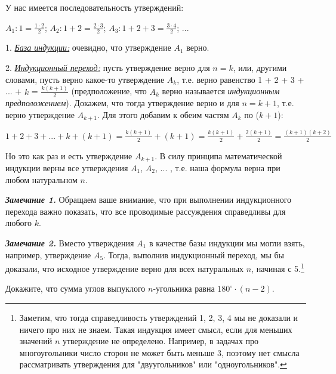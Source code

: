 \begin{prf}
У нас имеется последовательность утверждений:
\par
$A_1 : 1 = \frac{1 \cdot 2}{2}$;
\hfill
$A_2 : 1 + 2 = \frac{2 \cdot 3}{2}$;
\hfill
$A_3 : 1 + 2 + 3  = \frac{3 \cdot 4}{2}$;
\hfill
...
\par
1. \textit{\underline{База индукции:}} очевидно, что утверждение $A_1$ верно.
\par
2. \textit{\underline{Индукционный переход:}} пусть утверждение верно для $n = k$, или, другими словами, пусть верно какое-то
утверждение $A_k$, т.е. верно равенство 1 + 2 + 3 + ... + $k$ = $\frac{k(k+1)}{2}$ (предположение, что $A_k$ верно называется
\textit{индукционным предположением}). Докажем, что тогда утверждение верно и для $n = k +1$, т.е. верно утверждение $A_{k+1}$. Для этого добавим к обеим частям $A_k$ по ($k + 1$):

$1 + 2 + 3 + ... + k + (k + 1) = \frac{k(k+1)}{2} + (k + 1) = \frac{k(k+1)}{2} + \frac{2(k+1)}{2} = \frac{(k+1)(k+2)}{2}$

Но это как раз и есть утверждение $A_{k+1}$. В силу принципа математической индукции верны все утверждения
$A_1$, $A_2$, ... , т.е. наша формула верна при любом натуральном $n$.
\end{prf}

\par

\textbf{\textit{Замечание 1.}} Обращаем ваше внимание, что при выполнении индукционного перехода важно показать, что
все проводимые рассуждения справедливы для любого $k$.

\textbf{\textit{Замечание 2.}} Вместо утверждения $A_1$ в качестве базы индукции мы могли взять, например, утверждение $A_5$. Тогда, выполнив индукционный переход, мы бы доказали, что исходное утверждение верно для всех натуральных $n$, начиная с 5.\footnote{Заметим, что тогда справедливость утверждений 1, 2, 3, 4 мы не доказали и ничего про них не знаем. Такая индукция имеет смысл, если для меньших значений $n$ утверждение не определено. Например, в задачах про многоугольники число сторон не может быть меньше 3, поэтому нет смысла рассматривать утверждения для "двуугольников" или
"одноугольников".}

\begin{thm}
Докажите, что сумма углов выпуклого $n$-угольника равна $180 ^{\circ} \cdot (n-2)$.
\end{thm}

